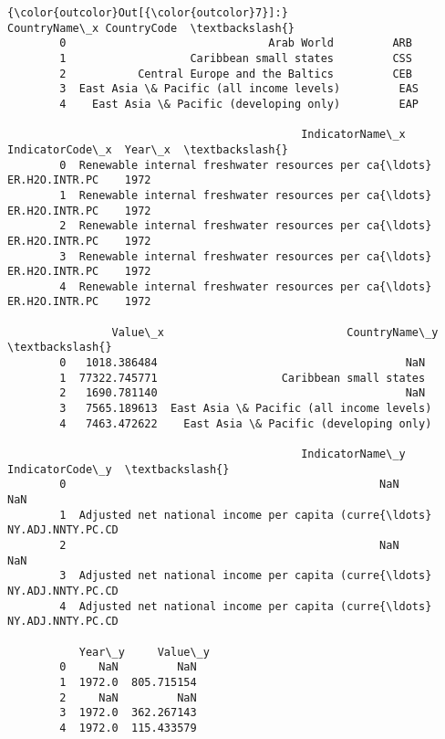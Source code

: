 \documentclass[11pt]{article}
\begin{document}
\begin{Verbatim}[commandchars=\\\{\}]
{\color{outcolor}Out[{\color{outcolor}7}]:}                              CountryName\_x CountryCode  \textbackslash{}
        0                               Arab World         ARB   
        1                   Caribbean small states         CSS   
        2           Central Europe and the Baltics         CEB   
        3  East Asia \& Pacific (all income levels)         EAS   
        4    East Asia \& Pacific (developing only)         EAP   
        
                                             IndicatorName\_x IndicatorCode\_x  Year\_x  \textbackslash{}
        0  Renewable internal freshwater resources per ca{\ldots}  ER.H2O.INTR.PC    1972   
        1  Renewable internal freshwater resources per ca{\ldots}  ER.H2O.INTR.PC    1972   
        2  Renewable internal freshwater resources per ca{\ldots}  ER.H2O.INTR.PC    1972   
        3  Renewable internal freshwater resources per ca{\ldots}  ER.H2O.INTR.PC    1972   
        4  Renewable internal freshwater resources per ca{\ldots}  ER.H2O.INTR.PC    1972   
        
                Value\_x                            CountryName\_y  \textbackslash{}
        0   1018.386484                                      NaN   
        1  77322.745771                   Caribbean small states   
        2   1690.781140                                      NaN   
        3   7565.189613  East Asia \& Pacific (all income levels)   
        4   7463.472622    East Asia \& Pacific (developing only)   
        
                                             IndicatorName\_y    IndicatorCode\_y  \textbackslash{}
        0                                                NaN                NaN   
        1  Adjusted net national income per capita (curre{\ldots}  NY.ADJ.NNTY.PC.CD   
        2                                                NaN                NaN   
        3  Adjusted net national income per capita (curre{\ldots}  NY.ADJ.NNTY.PC.CD   
        4  Adjusted net national income per capita (curre{\ldots}  NY.ADJ.NNTY.PC.CD   
        
           Year\_y     Value\_y  
        0     NaN         NaN  
        1  1972.0  805.715154  
        2     NaN         NaN  
        3  1972.0  362.267143  
        4  1972.0  115.433579  
\end{Verbatim}
            
\end{document}
